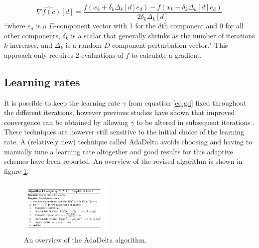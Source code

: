 \begin{equation}
 \hat{\nabla f(c)}[d] = \frac{f(x_k + \delta_k\Delta_k[d]e_d) - f(x_k - \delta_k\Delta_k[d]e_d)}{2\delta_k\Delta_k[d]}
\end{equation}
``where $e_d$ is a $D$-component vector with 1 for the $d$th component and 0 for all other components, $\delta_k$ is a 
scalar that generally shrinks as the number of iterations $k$ increases, and $\Delta_k$ is a random $D$-component perturbation
vector."
This approach only requires 2 evaluations of $f$ to calculate a gradient.

 
\subsection{Learning rates}
It is possible to keep the learning rate $\gamma$ from equation \ref{eq:gd} fixed throughout the different iterations, however previous studies have shown that improved convergence can be obtained by allowing
$\gamma$ to be altered in subsequent iterations \cite{jacobs1988increased}. These techniques are however still sensitive to the initial choice of the learning rate. A (relatively new) technique called AdaDelta\cite{zeiler2012adadelta}
avoids choosing and having to manually tune a learning rate altogether and good results for this adaptive schemes have been reported. An overview of the revised algorithm is shown in figure \ref{fig:adadelta}.
\begin{figure}	
    \centering
    \includegraphics[width=0.4\textwidth]{images/ada_delta.png}
    \caption{ An overview of the AdaDelta algorithm. }
    \label{fig:adadelta}
\end{figure}
